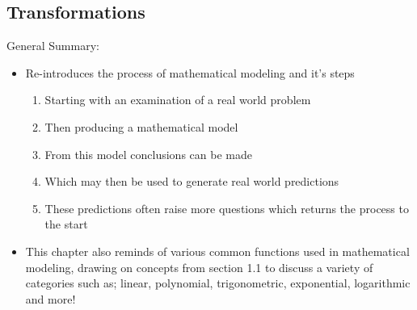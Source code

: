 \subsection{Transformations}
General Summary:
\begin{itemize}
    \item Re-introduces the process of mathematical modeling and it's steps 
    \begin{enumerate}
        \item Starting with an examination of a real world problem
        \item Then producing a mathematical model 
        \item From this model conclusions can be made
        \item Which may then be used to generate real world predictions
        \item These predictions often raise more questions which returns the process to the start
    \end{enumerate}
    \item This chapter also reminds of various common functions used in mathematical modeling, drawing on concepts from section 1.1 to discuss a variety of categories such as; linear, polynomial, trigonometric, exponential, logarithmic and more!
\end{itemize}
\newpage

\theendnotes

